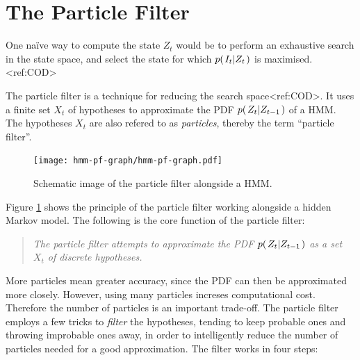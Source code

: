 %
%

%
%

%
%


\section{The Particle Filter}

One na\"{i}ve way to compute the state $Z_t$ would be to perform an exhaustive search in the state space, and select the state for which $p{(\left. I_t \middle\vert Z_t \right.)}$ is maximised.<ref:COD> 

The particle filter is a technique for reducing the search space<ref:COD>. It uses a finite set $X_t$ of hypotheses to approximate the PDF $p{(\left. Z_t \middle\vert Z_{t-1} \right.)}$ of a HMM. The hypotheses $X_t$ are also refered to as \emph{particles}, thereby the term ``particle filter''.

\begin{figure}
  \centering
  \texttt{[image: hmm-pf-graph/hmm-pf-graph.pdf]}
  \caption{Schematic image of the particle filter alongside a HMM.}
  \label{fig:hmm-graph}
\end{figure}

Figure \ref{fig:hmm-graph} shows the principle of the particle filter working alongside a hidden Markov model. The following is the core function of the particle filter:

\begin{quote}
  \emph{The particle filter attempts to approximate the PDF $p{(\left. Z_t \middle\vert Z_{t-1} \right.)}$ as a set $X_t$ of discrete hypotheses.}
\end{quote}

More particles mean greater accuracy, since the PDF can then be approximated more closely. However, using many particles increses computational cost.
Therefore the number of particles is an important trade-off. 
The particle filter employs a few tricks to \emph{filter} the hypotheses, 
tending to keep probable ones and throwing improbable ones away, in order to intelligently reduce the number 
of particles needed for a good approximation. The filter works in four steps:

